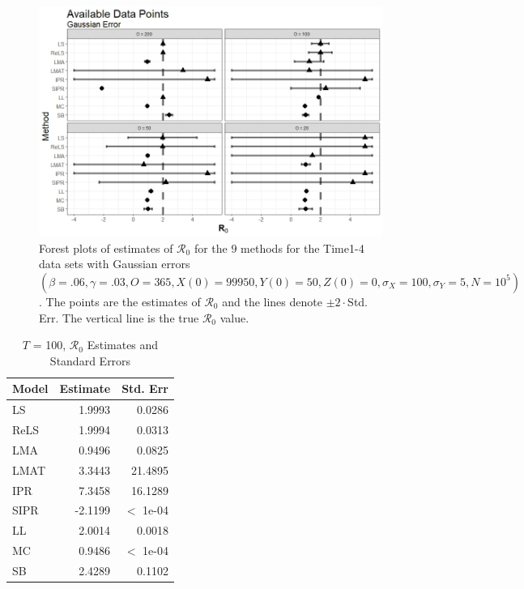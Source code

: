 \documentclass[12pt]{article}
\newcommand{\xxsir}{\ensuremath{9} } %
\newcommand{\rr}{\ensuremath{\mathcal{R}_0}}
\begin{document}
\begin{figure}[H]
  \centering
  \includegraphics[scale=0.5]{images/time_n.jpeg}
  \caption{Forest plots of estimates of $\rr$ for the \xxsir methods for the Time1-4 data sets with Gaussian errors $(\beta=.06, \gamma=.03, O=365, X(0)=99950, Y(0)=50, Z(0)=0, \sigma_X=100, \sigma_Y=5, N=10^5)$.  The points are the estimates of $\rr$ and the lines denote $\pm 2\cdot $Std. Err.  The vertical line is the true $\rr$ value.}\label{fig:time-res}
  \end{figure}


\begin{table}[H]
	

	\centering
	\begin{tabular}[t]{l|r|r}
		\hline
		Model & Estimate & Std. Err\\
		\hline
		LS & 1.9993 & 0.0286\\
		\hline
		ReLS & 1.9994 & 0.0313\\
		\hline
		LMA & 0.9496 & 0.0825\\
		\hline
		LMAT & 3.3443 & 21.4895\\
		\hline
		IPR & 7.3458 & 16.1289\\
		\hline
		SIPR & -2.1199 & $<$ 1e-04\\
		\hline
		LL & 2.0014 & 0.0018\\
		\hline
		MC & 0.9486 & $<$ 1e-04\\
		\hline
		SB & 2.4289 & 0.1102\\
		\hline
	\end{tabular}
        \caption{ $T$ = 100, $\rr$ Estimates and Standard Errors}\label{tab:time-res1}
\end{table}
\end{document}
